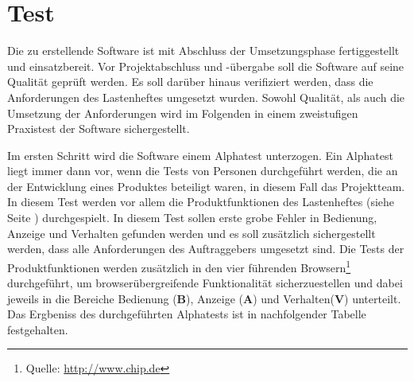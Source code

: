 \section{Test}
\label{sec:Test}

Die zu erstellende Software ist mit Abschluss der Umsetzungsphase fertiggestellt und einsatzbereit. Vor Projektabschluss und -übergabe soll die Software auf seine Qualität geprüft werden. Es soll darüber hinaus verifiziert werden, dass die Anforderungen des Lastenheftes umgesetzt wurden. Sowohl Qualität, als auch die Umsetzung der Anforderungen wird im Folgenden in einem zweistufigen Praxistest der Software sichergestellt.

Im ersten Schritt wird die Software einem Alphatest unterzogen. Ein Alphatest liegt immer dann vor, wenn die Tests von Personen durchgeführt werden, die an der Entwicklung eines Produktes beteiligt waren, in diesem Fall das Projektteam. In diesem Test werden vor allem die Produktfunktionen des Lastenheftes (siehe Seite \pageref{sec:Lastenheft}) durchgespielt. In diesem Test sollen erste grobe Fehler in Bedienung, Anzeige und Verhalten gefunden werden und es soll zusätzlich sichergestellt werden, dass alle Anforderungen des Auftraggebers umgesetzt sind. Die Tests der Produktfunktionen werden zusätzlich in den vier führenden Browsern\footnote{Quelle: \url{http://www.chip.de}} durchgeführt, um browserübergreifende Funktionalität sicherzuestellen und dabei jeweils in die Bereiche Bedienung (\textbf{B}), Anzeige (\textbf{A}) und Verhalten(\textbf{V}) unterteilt. Das Ergbeniss des durchgeführten Alphatests ist in nachfolgender Tabelle festgehalten.

